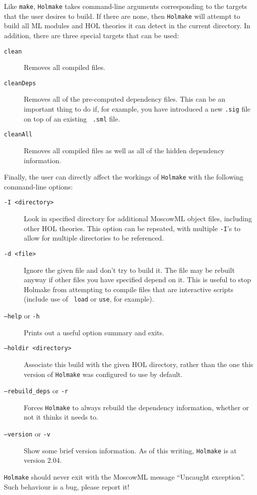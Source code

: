 \documentclass[12pt,fleqn,a4paper]{report}
\begin{document}
Like {\tt make}, {\tt Holmake} takes command-line arguments
corresponding to the targets that the user desires to build.  If there
are none, then {\tt Holmake} will attempt to build all ML modules and
HOL theories it can detect in the current directory.  In addition,
there are three special targets that can be used:
\begin{description}
\item[{\tt clean}] Removes all compiled files.
\item [{\tt cleanDeps}] Removes all of the pre-computed dependency
  files.  This can be an important thing to do if, for example, you
  have introduced a new {\tt .sig} file on top of an existing {\tt
  .sml} file.
\item [{\tt cleanAll}] Removes all compiled files as well as all of
  the hidden dependency information.
\end{description}

Finally, the user can directly affect the workings of \verb+Holmake+
with the following command-line options:
\begin{description}
\item[\tt -I <directory>] Look in specified directory for additional
  MoscowML object files, including other HOL theories.  This option
  can be repeated, with multiple {\tt -I}'s to allow for multiple
  directories to be referenced.
\item[\tt -d <file>] Ignore the given file and don't try to build it.
  The file may be rebuilt anyway if other files you have specified
  depend on it.  This is useful to stop Holmake from attempting to
  compile files that are interactive scripts (include use of {\tt
  load} or {\tt use}, for example).
\item[{\tt --help} or {\tt -h}] Prints out a useful option summary and
  exits.
\item[\tt --holdir <directory>] Associate this build with the given
  HOL directory, rather than the one this version of {\tt Holmake} was
  configured to use by default.
\item[{\tt --rebuild\_deps} or {\tt -r}] Forces {\tt Holmake} to
  always rebuild the dependency information, whether or not it thinks
  it needs to.
\item[{\tt --version} or {\tt -v}] Show some brief version
  information.  As of this writing, {\tt Holmake} is at version 2.04.
\end{description}

{\tt Holmake} should never exit with the MoscowML message ``Uncaught
exception''.  Such behaviour is a bug, please report it!
\end{document}

